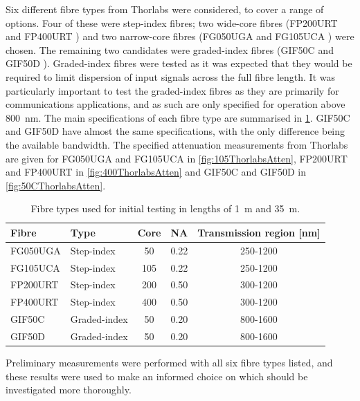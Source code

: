 \documentclass[a4paper,11pt]{article}
\begin{document}
Six different fibre types from Thorlabs were considered, to cover a range of options. Four of these were step-index fibres; two wide-core fibres (FP200URT \cite{bib:fp200urt} and FP400URT \cite{bib:fp400urt}) and two narrow-core fibres (FG050UGA \cite{bib:fg050uga} and FG105UCA \cite{bib:fg105uca}) were chosen. The remaining two candidates were graded-index fibres (GIF50C \cite{bib:gif50c} and GIF50D \cite{bib:gif50d}). Graded-index fibres were tested as it was expected that they would be required to limit dispersion of input signals across the full fibre length. It was particularly important to test the graded-index fibres as they are primarily for communications applications, and as such are only specified for operation above 800~nm. The main specifications of each fibre type are summarised in \cref{tab:fibres}. GIF50C and GIF50D have almost the same specifications, with the only difference being the available bandwidth. The specified attenuation measurements from Thorlabs are given for FG050UGA and FG105UCA in \cref{fig:105ThorlabsAtten}, FP200URT and FP400URT in \cref{fig:400ThorlabsAtten} and GIF50C and GIF50D in \cref{fig:50CThorlabsAtten}.
\begin{table}[h]
\centering
\begin{tabular}{llccc}
\toprule
Fibre	   & Type   		  & Core \diameter [$\mu$m] &  NA 	  &  Transmission region [nm]\\ \midrule
FG050UGA   &  Step-index      &           \phantom{0}50  			&  0.22   &   250-1200       \\
FG105UCA   &  Step-index      &           105  			&  0.22   &   250-1200       \\
FP200URT   &  Step-index      &           200  			&  0.50   &   300-1200       \\
FP400URT   &  Step-index      &           400  			&  0.50   &   300-1200      \\
GIF50C     &  Graded-index    &           \phantom{0}50  			&  0.20	  &   800-1600       \\
GIF50D     &  Graded-index    &           \phantom{0}50 			&  0.20   &   800-1600      \\ \bottomrule
\end{tabular}
\caption{Fibre types used for initial testing in lengths of 1~m and 35~m.}\label{tab:fibres}
\end{table}
Preliminary measurements were performed with all six fibre types listed, and these results were used to make an informed choice on which should be investigated more thoroughly.
\end{document}

